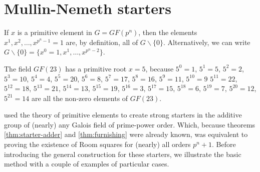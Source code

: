 \documentclass[
  11pt,
  a4paper]{book}\usepackage[]{graphicx}\usepackage[]{xcolor}
\newcounter{example}
\begin{document}
\section{Mullin-Nemeth starters}

If $x$ is a primitive element in $G = GF(p^n)$, then the elements
$x^1, x^2, \ldots, x^{p^n - 1} = 1$ are, by definition, all of
$G \backslash \{0\}$. Alternatively, we can write
$G \backslash \{0\} = \{x^0 = 1, x^1, \ldots, x^{p^n - 2}\}$.

\begin{example}
The field $GF(23)$ has a primitive root $x = 5$, because
$5^0 = 1$, $5^1 = 5$, $5^2 = 2$, $5^3 = 10$, $5^4 = 4$,
$5^5 = 20$, $5^6 = 8$, $5^7 = 17$, $5^8 = 16$, $5^9 = 11$,
$5^{10} = 9$ $5^{11} = 22$, $5^{12} = 18$, $5^{13} = 21$,
$5^{14}  =13$, $5^{15} = 19$, $5^{16} = 3$, $5^{17} = 15$,
$5^{18} = 6$, $5^{19} = 7$, $5^{20} = 12$, $5^{21} = 14$
are all the non-zero elements of $GF(23)$.
\end{example}

\cite{mullinFurnishingRoomSquares1969}
used the theory
of primitive elements to create strong starters in the
additive group of (nearly) any Galois field of prime-power
order. Which, because theorems
\ref{thm:starter-adder}
and
\ref{thm:furnishing}
were already
known, was equivalent to proving the existence of Room
squares for (nearly) all orders $p^n + 1$. Before
introducing the general construction for these starters, we
illustrate the basic method with a couple of examples of
particular cases.
\end{document}
